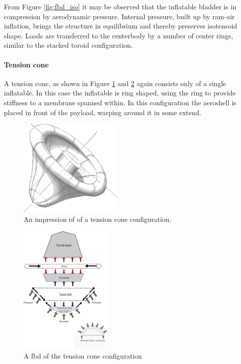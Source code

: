 From Figure  \ref{fig:fbd_iso} it may be observed that the inflatable bladder is in compression by aerodynamic pressure. Internal pressure, built up by ram-air inflation, brings the structure in equilibrium and thereby preserves isotensoid shape. Loads are transferred to the centerbody by a number of center rings, similar to the stacked toroid configuration.

\paragraph{Tension cone}

A tension cone, as shown in Figure  \ref{fig:conc_tension} and \ref{fig:fbd_tension} again consists only of a single inflatable. In this case the inflatable is ring shaped, using the ring to provide stiffness to a membrane spanned within. In this configuration the aeroshell is placed in front of the payload, warping around it in some extend.

\begin{figure}[H]
\centering
\includegraphics[width = 0.45\textwidth]{Figure/tension_cone.eps}

\caption{An impression of of a tension cone configuration.}

\label{fig:conc_tension}
\end{figure}

\begin{figure}[H]
\centering
\includegraphics[width = 0.4\textwidth]{Figure/FBD_tensioncone.eps}
\caption{A \gls{fbd} of the tension cone configuration}
\label{fig:fbd_tension}
\end{figure}

